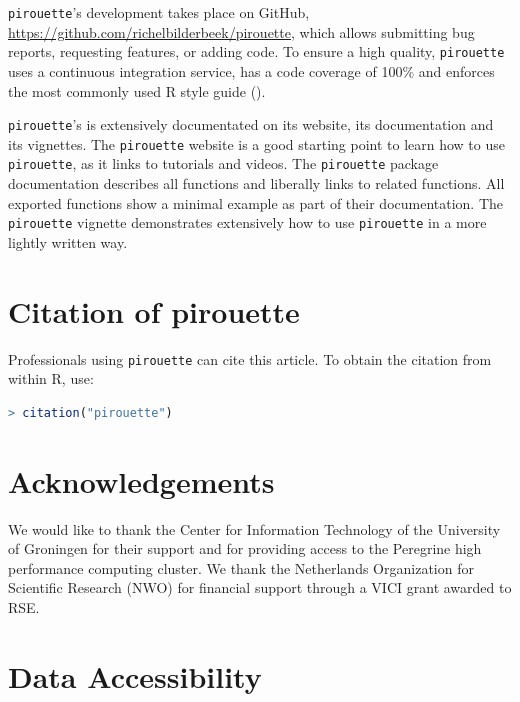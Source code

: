 \documentclass{article}
\begin{document}
\verb;pirouette;'s development takes place on GitHub,
\url{https://github.com/richelbilderbeek/pirouette},
which allows submitting bug reports, requesting features, 
or adding code. To ensure a high quality, \verb;pirouette; 
uses a continuous integration service, has a code coverage of 100\%
and enforces the most commonly used R style guide (\cite{style_guide}).

\verb;pirouette;'s is extensively documentated on its website,
its documentation and its vignettes.
The \verb;pirouette; website is a good starting point to learn
how to use \verb;pirouette;, as it links to tutorials and videos.
The \verb;pirouette; package documentation describes
all functions and liberally links to related functions.
All exported functions show a minimal example as part of their documentation.
The \verb;pirouette; vignette demonstrates extensively how 
to use \verb;pirouette; in a more lightly written way. 

\section{Citation of pirouette}

Professionals using \verb;pirouette; can cite this
article. To obtain the citation from within R, use:

\begin{lstlisting}[language=R]
> citation("pirouette")
\end{lstlisting}

\section{Acknowledgements}

We would like to thank the Center for Information Technology of the University 
of Groningen for their support and for providing access to the Peregrine 
high performance computing cluster. 
We thank the Netherlands 
Organization for Scientific Research (NWO) for financial support 
through a VICI grant awarded to RSE.

\section{Data Accessibility}
\end{document}
